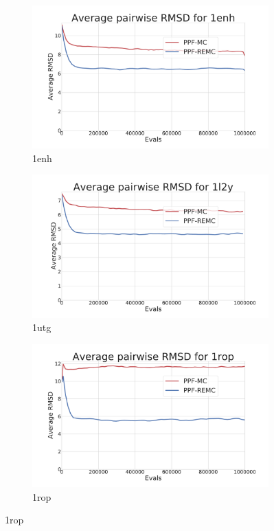 \begin{figure}[ht]\ContinuedFloat
  \begin{subfigure}{0.7\linewidth}
    \centering
    \includegraphics[width=1\linewidth]{Figuras/plots/rmsd_convergence/avg_rmsd_1enh.pdf}
    \caption{1enh}
  \end{subfigure}
%
  \begin{subfigure}{0.7\linewidth}
    \centering
    \includegraphics[width=1\linewidth]{Figuras/plots/rmsd_convergence/avg_rmsd_1l2y.pdf}
    \caption{1utg}
  \end{subfigure}
%
  \begin{subfigure}{0.7\linewidth}
    \centering
    \includegraphics[width=1\linewidth]{Figuras/plots/rmsd_convergence/avg_rmsd_1rop.pdf}
    \caption{1rop}
  \end{subfigure}
\end{figure}

